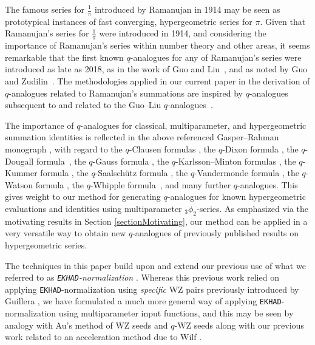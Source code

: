 \documentclass[12pt]{article}
\begin{document}
 The famous series for $\frac{1}{\pi}$ introduced by Ramanujan in 1914 \cite[pp.\ 352--354]{Berndt1994} \cite{Ramanujan1914} may be 
 seen as prototypical instances of fast converging, hypergeometric series for $\pi$. Given that Ramanujan's series for $\frac{1}{\pi}$ were 
 introduced in 1914, and considering the importance of Ramanujan's series within number theory and other areas, it seems remarkable 
 that the first known $q$-analogues for any of Ramanujan's series were introduced as late as 2018, as in the work of Guo and 
 Liu~\cite{GuoLiu2018}, and as noted by Guo and Zudilin~\cite{GuoZudilin2018}. 
 The methodologies applied in our current paper in the derivation of 
 $q$-analogues related to Ramanujan's summations are inspired by $q$-analogues subsequent to and related to the Guo--Liu 
 $q$-analogues~\cite{ChenChu2021,ChenChu2023,Guillera2018,Guo2020,GuoZudilin2018,HouKrattenthalerSun2019,HouSun2021,
Sun2019,WangZhong2023,Wei2023,Wei2020,WeiRuan2024}. 

 The importance of $q$-analogues for classical, multiparameter, and hypergeometric summation identities is reflected in the above 
 referenced Gasper--Rahman monograph \cite{GasperRahman2004}, with regard to the $q$-Clausen formulas 
 \cite[\S8.8]{GasperRahman2004}, the $q$-Dixon formula \cite[p.\ 44]{GasperRahman2004}, the $q$-Dougall formula~\cite[p.\ 
 44]{GasperRahman2004}, the $q$-Gauss formula \cite[p.\ 14]{GasperRahman2004}, the $q$-Karlsson--Minton formulas 
 \cite[\S1.9]{GasperRahman2004}, the $q$-Kummer formula \cite[p.\ 18]{GasperRahman2004}, the $q$-Saalsch\"{u}tz formula 
 \cite[\S1.7]{GasperRahman2004}, the $q$-Vandermonde formula \cite[p.\ 14]{GasperRahman2004}, the $q$-Watson formula
 \cite[p.\ 61]{GasperRahman2004}, the $q$-Whipple formula~\cite[p.\ 61]{GasperRahman2004}, and many further $q$-analogues. 
 This gives weight to our method for generating $q$-analogues for known hypergeometric evaluations and identities using 
 multiparameter ${}_{3}\phi_{2}$-series. As emphasized via the motivating results in Section \ref{sectionMotivating}, our method can be 
 applied in a very versatile way to obtain new $q$-analogues of previously published results on hypergeometric series. 

 The techniques in this paper build upon and extend our previous use of what we referred to as \emph{{\tt EKHAD}-normalization} 
 \cite{Campbell2026}. Whereas this previous work relied on applying {\tt EKHAD}-normalization using \emph{specific} WZ pairs previously 
 introduced by Guillera \cite{Guillera2006,Guillera2002}, we have formulated a much more general way of applying 
 {\tt EKHAD}-normalization using multiparameter input functions, and this may be seen by analogy with Au's method of WZ seeds 
 \cite{Au2025} and $q$-WZ seeds \cite{Auunpublished} along with our previous work 
 \cite{Campbell2025Hypergeometric,Campbellunpublished,CampbellLevrie2024} related
 to an acceleration method due to Wilf \cite{Wilf1999}. 
\end{document}
